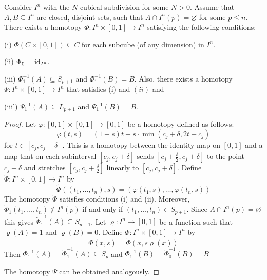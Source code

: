 \begin{lemma}
\label{EXCISION PREPARATION LEMMA}
Consider $I^{n}$ with the $N$-cubical subdivision for some $N> 0$.
Assume that $A, B\subseteq I^{n}$ are closed, disjoint sets, such that
$A \cap I^{n}(p) = \varnothing$ for some $p\leq n$.
There exists a homotopy $\Phi\colon I^{n}\times [0, 1] \to I^{n}$ satisfying 
the following conditions: 
\benu
\item [(i)] $\Phi(C\times[0, 1]) \subseteq C$ for each subcube (of any dimension) in $I^{n}$.
\item [(ii)] $\Phi_{0} = \mathrm{id}_{I^{n}}$.
\item [(iii)] $\Phi_{1}^{-1}(A)\subseteq S_{p+1}$ and $\Phi_{1}^{-1}(B) = B$.
\eenu
Also, there exists a homotopy $\Psi\colon I^{n}\times [0, 1] \to I^{n}$ 
that satisfies (i) and $(ii)$ and 
\benu
\item [(iii’)] $\Psi_{1}^{-1}(A)\subseteq L_{p+1}$ and $\Psi_{1}^{-1}(B) = B$.
\eenu
\end{lemma}

\begin{proof}
Let $\varphi \colon [0, 1]\times [0, 1] \to [0, 1]$ be a homotopy defined as follows:
\[
\varphi(t, s) = (1-s)t + s\cdot \min(c_{j}+\delta, 2t - c_{j})
\]
for $t\in [c_{j}, c_{j} + \delta]$. This is a homotopy between the identity map 
on $[0, 1]$ and a map that on each subinterval $[c_{j}, c_{j} + \delta]$ sends
$[c_{j} + \frac{\delta}{2}, c_{j} + \delta ]$ to the point $c_{j} + \delta$ and stretches 
$[c_{j}, c_{j} + \frac{\delta}{2}]$ linearly to $[c_{j}, c_{j} + \delta]$.
Define $\widetilde{\Phi}\colon I^{n}\times [0, 1]\to I^{n}$ by 
\[
\widetilde{\Phi}((t_{1}, \dots, t_{n}), s) = 
(\varphi(t_{1}, s), \dots, \varphi(t_{n}, s))
\]
The homotopy $\widetilde{\Phi}$ satisfies conditions (i) and (ii).
Moreover, $\widetilde{\Phi}_{1}(t_{1}, \dots, t_{n}) \not\in I^{n}(p)$ if and only if 
$(t_{1}, \dots, t_{n})\in S_{p+1}$. Since $A\cap I^{n}(p) = \varnothing$ this gives 
$\widetilde{\Phi}_{1}^{-1}(A) \subseteq S_{p+1}$. 
Let $\varrho\colon I^{n} \to [0, 1]$ be a function such that 
$\varrho(A) = 1$ and $\varrho(B) = 0$. Define $\Phi\colon I^{n}\times [0, 1] \to I^{n}$  
by 
\[
\Phi(x, s) = \widetilde{\Phi}(x, s\varrho(x)) 
\]
Then $\Phi_{1}^{-1}(A) = \widetilde{\Phi}_{1}^{-1}(A)\subseteq S_{p}$
and $\Phi_{1}^{-1}(B) = \widetilde{\Phi}_{0}^{-1}(B) = B$

The homotopy $\Psi$ can be obtained analogously.

\end{proof}




